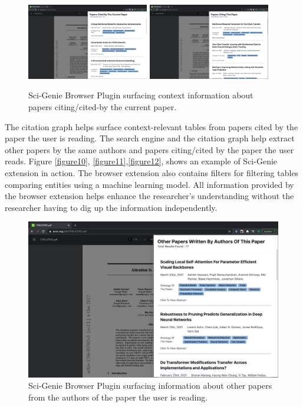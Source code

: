 \begin{figure}[h]
    \includegraphics[width=0.475\textwidth]{src/images/sci-genie-ext-cite-out-exp.png}
    \hfill
    \includegraphics[width=0.475\textwidth]{src/images/sci-genie-ext-cite-exp.png}
    \caption{ Sci-Genie Browser Plugin surfacing context information about papers citing/cited-by the current paper. }
    \label{figure\arabic{figurecounter}}
\end{figure}

The citation graph helps surface context-relevant tables from papers cited by the paper the user is reading.  The search engine and the citation graph help extract other papers by the same authors and papers citing/cited by the paper the user reads. Figure \ref{figure10}, \ref{figure11},\ref{figure12}, shows an example of Sci-Genie extension in action. The browser extension also contains filters for filtering tables comparing entities using a machine learning model. All information provided by the browser extension helps enhance the researcher’s understanding without the researcher having to dig up the information independently. 

\begin{figure}[h]
    \centering
    \includegraphics[width=\maxwidth{\textwidth}]{src/images/sci-genie-ext-authors-exp.png}
    \caption{ Sci-Genie Browser Plugin surfacing information about other papers from the authors of the paper the user is reading. }
    \label{figure\arabic{figurecounter}}
\end{figure}

